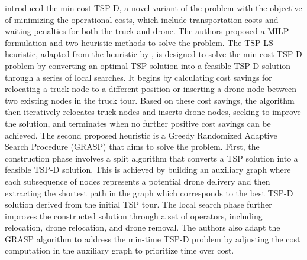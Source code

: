 \documentclass{article}
\begin{document}
	\par
	\citeauthor{Ha2018} \cite{Ha2018} introduced the min-cost TSP-D, a novel variant of the problem with the objective of minimizing the operational costs, which include transportation costs and waiting penalties for both the truck and drone. The authors proposed a MILP formulation and two heuristic methods to solve the problem. The TSP-LS heuristic, adapted from the heuristic by \citeauthor{Murray2015}, is designed to solve the min-cost TSP-D problem by converting an optimal TSP solution into a feasible TSP-D solution through a series of local searches. It begins by calculating cost savings for relocating a truck node to a different position or inserting a drone node between two existing nodes in the truck tour. Based on these cost savings, the algorithm then iteratively relocates truck nodes and inserts drone nodes, seeking to improve the solution, and terminates when no further positive cost savings can be achieved. The second proposed heuristic is a Greedy Randomized Adaptive Search Procedure (GRASP) that aims to solve the problem. First, the construction phase involves a split algorithm that converts a TSP solution into a feasible TSP-D solution. This is achieved by building an auxiliary graph where each subsequence of nodes represents a potential drone delivery and then extracting the shortest path in the graph which corresponds to the best TSP-D solution derived from the initial TSP tour. The local search phase further improves the constructed solution through a set of operators, including relocation, drone relocation, and drone removal. The authors also adapt the GRASP algorithm to address the min-time TSP-D problem by adjusting the cost computation in the auxiliary graph to prioritize time over cost.
	\par
\end{document}
